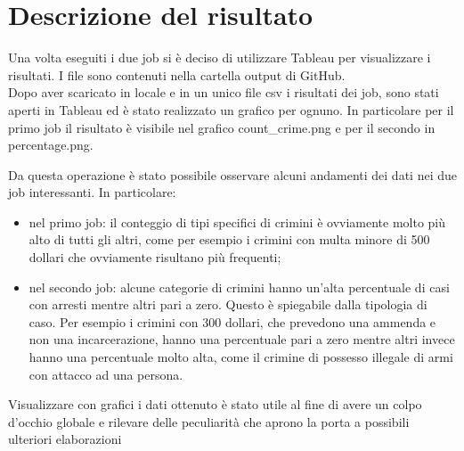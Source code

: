 \documentclass[10pt]{article}
\begin{document}
\section{Descrizione del risultato}
Una volta eseguiti i due job si è deciso di utilizzare Tableau per visualizzare i risultati. I file sono contenuti nella cartella output di GitHub. \\
Dopo aver scaricato in locale e in un unico file csv i risultati dei job, sono stati aperti in Tableau ed è stato realizzato un grafico per ognuno. In particolare per il primo job il risultato è visibile nel grafico count\_crime.png e per il secondo in percentage.png.

Da questa operazione è stato possibile osservare alcuni andamenti dei dati nei due job interessanti. In particolare:
\begin{itemize}
\item nel primo job: il conteggio di tipi specifici di crimini è ovviamente molto più alto di tutti gli altri, come per esempio i crimini con multa minore di 500 dollari che ovviamente risultano più frequenti;
\item nel secondo job: alcune categorie di crimini hanno un'alta percentuale di casi con arresti mentre altri pari a zero. Questo è spiegabile dalla tipologia di caso. Per esempio i crimini con 300 dollari, che prevedono una ammenda e non una incarcerazione, hanno una percentuale pari a zero mentre altri invece hanno una percentuale molto alta, come il crimine di possesso illegale di armi con attacco ad una persona.
\end{itemize}
Visualizzare con grafici i dati ottenuto è stato utile al fine di avere un colpo d'occhio globale e rilevare delle peculiarità che aprono la porta a possibili ulteriori elaborazioni
\end{document}
